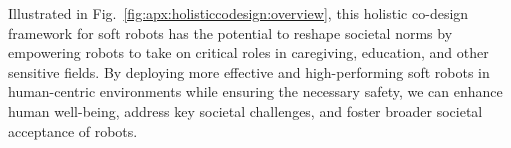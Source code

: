 Illustrated in Fig.~\ref{fig:apx:holisticcodesign:overview}, this holistic co-design framework for soft robots has the potential to reshape societal norms by empowering robots to take on critical roles in caregiving, education, and other sensitive fields. By deploying more effective and high-performing soft robots in human-centric environments while ensuring the necessary safety, we can enhance human well-being, address key societal challenges, and foster broader societal acceptance of robots.